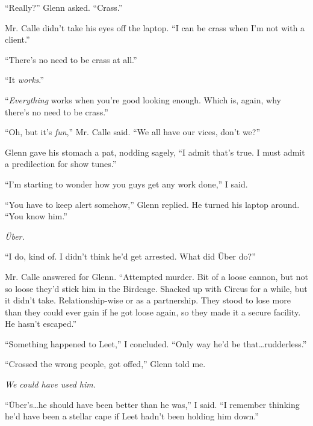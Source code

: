 ``Really?''  Glenn asked.  ``Crass.''



Mr. Calle didn't take his eyes off the laptop.  ``I can be crass when I'm not with a client.''



``There's no need to be crass at all.''



``It \emph{works}.''



``\emph{Everything }works when you're good looking enough.  Which is, again, why there's no need to be crass.''



``Oh, but it's \emph{fun},'' Mr. Calle said.  ``We all have our vices, don't we?''



Glenn gave his stomach a pat, nodding sagely, ``I admit that's true.  I must admit a predilection for show tunes.''



``I'm starting to wonder how you guys get any work done,'' I said.



``You have to keep alert somehow,'' Glenn replied.  He turned his laptop around.  ``You know him.''



\emph{\"{U}ber.}



``I do, kind of.  I didn't think he'd get arrested.  What did \"{U}ber do?''



Mr. Calle answered for Glenn.  ``Attempted murder.  Bit of a loose cannon, but not so loose they'd stick him in the Birdcage.  Shacked up with Circus for a while, but it didn't take.  Relationship-wise or as a partnership.  They stood to lose more than they could ever gain if he got loose again, so they made it a secure facility.  He hasn't escaped.''



``Something happened to Leet,'' I concluded.  ``Only way he'd be that\ldots rudderless.''



``Crossed the wrong people, got offed,'' Glenn told me.



\emph{We could have used him}.



``\"{U}ber's\ldots he should have been better than he was,'' I said.  ``I remember thinking he'd have been a stellar cape if Leet hadn't been holding him down.''



